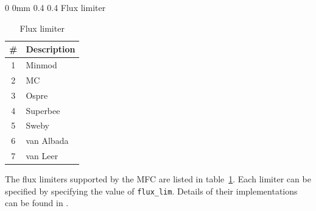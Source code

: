 \documentclass[11pt]{article}
\makeatletter
\renewcommand{\section}{\@startsection
{section}%
{0}%
{0mm}%
{0.4\baselineskip}%
{0.4\baselineskip}%
{\normalfont\Large\bfseries\color{myBrown}}}%
\newcommand\tablefont{\footnotesize}
\makeatother
\begin{document}
\section{Flux limiter}\label{s:fl}

\begin{table}[H]
    \centering
	{\tablefont
	\begin{tabular}{ | c |  l | }
	\hline
		\textbf{\#} & \bf Description  \\
		\hline
		1 & Minmod \\
		2 & MC \\
		3 & Ospre  \\
		4 & Superbee \\
		5 & Sweby \\
		6 & van Albada\\
		7 & van Leer\\
		\hline
	\end{tabular}}
	\caption{Flux limiter}
	\label{t:fl}
\end{table}

The flux limiters supported by the MFC are listed in table~\ref{t:fl}. Each limiter can be specified by specifying the value of \texttt{flux_lim}. Details of their implementations can be found in \citet{Meng16}.
\end{document}

